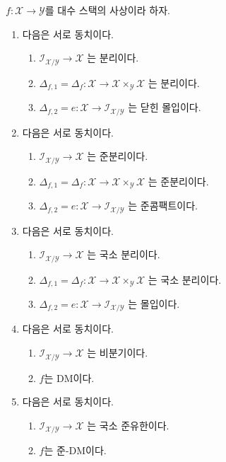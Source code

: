 \begin{lemma}
\label{lemma-diagonal-diagonal}
$f : \mathcal{X} \to \mathcal{Y}$를 대수 스택의 사상이라 하자.
\begin{enumerate}
\item
다음은 서로 동치이다.
\begin{enumerate}
\item $\mathcal{I}_{\mathcal{X}/\mathcal{Y}} \to \mathcal{X}$
는 분리이다.
\item $\Delta_{f, 1} = \Delta_f :
\mathcal{X} \to \mathcal{X} \times_\mathcal{Y} \mathcal{X}$
는 분리이다.
\item $\Delta_{f, 2} = e :
\mathcal{X} \to \mathcal{I}_{\mathcal{X}/\mathcal{Y}}$
는 닫힌 몰입이다.
\end{enumerate}
\item
다음은 서로 동치이다.
\begin{enumerate}
\item $\mathcal{I}_{\mathcal{X}/\mathcal{Y}} \to \mathcal{X}$
는 준분리이다.
\item $\Delta_{f, 1} = \Delta_f :
\mathcal{X} \to \mathcal{X} \times_\mathcal{Y} \mathcal{X}$
는 준분리이다.
\item $\Delta_{f, 2} = e :
\mathcal{X} \to \mathcal{I}_{\mathcal{X}/\mathcal{Y}}$
는 준콤팩트이다.
\end{enumerate}
\item
다음은 서로 동치이다.
\begin{enumerate}
\item $\mathcal{I}_{\mathcal{X}/\mathcal{Y}} \to \mathcal{X}$
는 국소 분리이다.
\item $\Delta_{f, 1} = \Delta_f :
\mathcal{X} \to \mathcal{X} \times_\mathcal{Y} \mathcal{X}$
는 국소 분리이다.
\item $\Delta_{f, 2} = e :
\mathcal{X} \to \mathcal{I}_{\mathcal{X}/\mathcal{Y}}$
는 몰입이다.
\end{enumerate}
\item
다음은 서로 동치이다.
\begin{enumerate}
\item $\mathcal{I}_{\mathcal{X}/\mathcal{Y}} \to \mathcal{X}$
는 비분기이다.
\item $f$는 DM이다.
\end{enumerate}
\item
다음은 서로 동치이다.
\begin{enumerate}
\item $\mathcal{I}_{\mathcal{X}/\mathcal{Y}} \to \mathcal{X}$
는 국소 준유한이다.
\item $f$는 준-DM이다.
\end{enumerate}
\end{enumerate}
\end{lemma}

